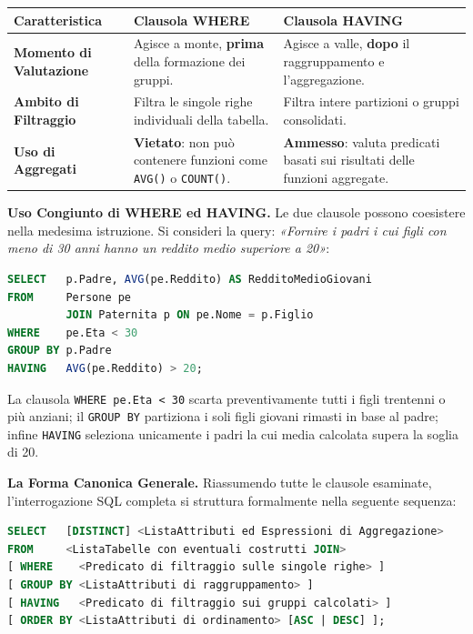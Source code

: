 \documentclass[12pt]{extarticle}
\begin{document}
\begin{center}
\small
\begin{tabular}{lp{6.5cm}p{6.5cm}}
    \toprule
    \textbf{Caratteristica} & \textbf{Clausola WHERE} & \textbf{Clausola HAVING} \\
    \midrule
    \textbf{Momento di Valutazione} & Agisce a monte, \textbf{prima} della formazione dei gruppi. & Agisce a valle, \textbf{dopo} il raggruppamento e l'aggregazione. \\
    \addlinespace
    \textbf{Ambito di Filtraggio} & Filtra le singole righe individuali della tabella. & Filtra intere partizioni o gruppi consolidati. \\
    \addlinespace
    \textbf{Uso di Aggregati} & \textbf{Vietato}: non può contenere funzioni come \texttt{AVG()} o \texttt{COUNT()}. & \textbf{Ammesso}: valuta predicati basati sui risultati delle funzioni aggregate. \\
    \bottomrule
\end{tabular}
\end{center}

\medskip
\noindent \textbf{Uso Congiunto di WHERE ed HAVING.} Le due clausole possono coesistere nella medesima istruzione. Si consideri la query: \textit{«Fornire i padri i cui figli con meno di 30 anni hanno un reddito medio superiore a 20»}:

\begin{lstlisting}[language=SQL]
SELECT   p.Padre, AVG(pe.Reddito) AS RedditoMedioGiovani
FROM     Persone pe
         JOIN Paternita p ON pe.Nome = p.Figlio
WHERE    pe.Eta < 30
GROUP BY p.Padre
HAVING   AVG(pe.Reddito) > 20;
\end{lstlisting}
La clausola \texttt{WHERE pe.Eta < 30} scarta preventivamente tutti i figli trentenni o più anziani; il \texttt{GROUP BY} partiziona i soli figli giovani rimasti in base al padre; infine \texttt{HAVING} seleziona unicamente i padri la cui media calcolata supera la soglia di 20.

\noindent \textbf{La Forma Canonica Generale.} Riassumendo tutte le clausole esaminate, l'interrogazione SQL completa si struttura formalmente nella seguente sequenza:

\begin{lstlisting}[language=SQL]
SELECT   [DISTINCT] <ListaAttributi ed Espressioni di Aggregazione>
FROM     <ListaTabelle con eventuali costrutti JOIN>
[ WHERE    <Predicato di filtraggio sulle singole righe> ]
[ GROUP BY <ListaAttributi di raggruppamento> ]
[ HAVING   <Predicato di filtraggio sui gruppi calcolati> ]
[ ORDER BY <ListaAttributi di ordinamento> [ASC | DESC] ];
\end{lstlisting}
\end{document}
